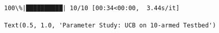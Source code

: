 \documentclass[11pt]{ctexart}
\makeatletter
\newcommand{\boxspacing}{\kern\kvtcb@left@rule\kern\kvtcb@boxsep}
\newcommand{\prompt}[4]{
        {\ttfamily\llap{{\color{#2}[#3]:\hspace{3pt}#4}}\vspace{-\baselineskip}}
    }
\makeatother
\begin{document}
    \begin{Verbatim}[commandchars=\\\{\}]
100\%|██████████| 10/10 [00:34<00:00,  3.44s/it]
    \end{Verbatim}

            \begin{tcolorbox}[breakable, size=fbox, boxrule=.5pt, pad at break*=1mm, opacityfill=0]
\prompt{Out}{outcolor}{18}{\boxspacing}
\begin{Verbatim}[commandchars=\\\{\}]
Text(0.5, 1.0, 'Parameter Study: UCB on 10-armed Testbed')
\end{Verbatim}
\end{tcolorbox}
        
    \begin{center}
    \end{center}
    { \hspace*{\fill} \\}
    
\end{document}
